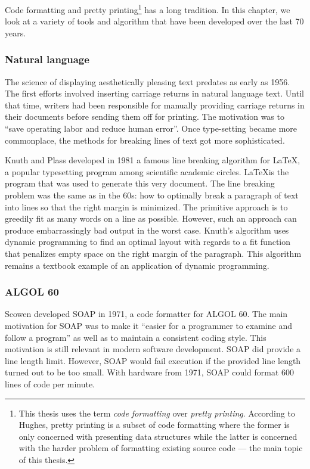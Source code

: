Code formatting and pretty printing\footnote{
  This thesis uses the term \emph{code formatting} over \emph{pretty printing}.
  According to Hughes\autocite{hughes_design_1995}, pretty printing is a subset of code formatting where
  the former is only concerned with presenting data structures while the latter is
  concerned with the harder problem of formatting existing source code --- the main topic of this thesis.} has a long tradition.
In this chapter, we look at a variety of tools and algorithm that have been developed over the last 70 years.

\subsubsection{Natural language}
The science of displaying aesthetically pleasing text predates as early as 1956\autocite{harris_keyboard_1956}.
The first efforts involved inserting carriage returns in natural language text.
Until that time, writers had been responsible for manually providing carriage returns in their documents before sending them off for printing.
The motivation was to ``save operating labor and reduce human error''.
Once type-setting became more commonplace, the methods for breaking lines of text got more sophisticated.

Knuth and Plass developed in 1981 a famous line breaking algorithm\autocite{knuth_breaking_1981} for \LaTeX{}, a popular typesetting program among scientific academic circles.
\LaTeX is the program that was used to generate this very document.
The line breaking problem was the same as in the 60s: how to optimally break a paragraph of text into lines so that the right margin is minimized.
The primitive approach is to greedily fit as many words on a line as possible.
However, such an approach can produce embarrassingly bad output in the worst case.
Knuth's algorithm uses dynamic programming to find an optimal layout with regards to a fit function that penalizes empty space on the right margin of the paragraph.
This algorithm remains a textbook example of an application of dynamic programming\autocite{dreyfus2002richard,kleinberg2006algorithm}.

\subsubsection{ALGOL 60}
Scowen\autocite{scowen_soapprogram_1971} developed SOAP in 1971, a code formatter for ALGOL 60.
The main motivation for SOAP was to make it ``easier for a programmer to examine and follow a program'' as well as to maintain a consistent coding style.
This motivation is still relevant in modern software development.
SOAP did provide a line length limit.
However, SOAP would fail execution if the provided line length turned out to be too small.
With hardware from 1971, SOAP could format 600 lines of code per minute.

